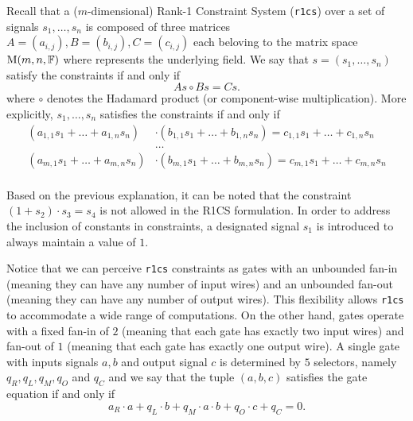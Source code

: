 Recall that a ($m$-dimensional) Rank-1 Constraint System (\texttt{r1cs}) over a set of signals $s_1, \dots, s_n$ is composed of three matrices $A = (a_{i, j}), B = (b_{i, j}),  C = (c_{i, j})$ each beloving to the matrix space $\mathrm{M}(m, n, \mathbb{F})$ where \FF represents the underlying field. We say that $s = (s_1, \dots, s_n)$ satisfy the constraints if and only if 
\[
As \circ Bs = Cs.
\]
where $\circ$ denotes the Hadamard product (or component-wise multiplication). More explicitly, $s_1, \dots, s_n$ satisfies the constraints if and only if
\begin{align*}
\left( a_{1, 1} s_1 + \dots + a_{1, n} s_n \right) &\cdot \left( b_{1, 1} s_1 + \dots + b_{1, n} s_n \right) = c_{1, 1} s_1 + \dots + c_{1, n} s_n \\
&\dots  \\
\left( a_{m, 1} s_1 + \dots + a_{m, n} s_n \right) &\cdot \left( b_{m, 1} s_1 + \dots + b_{m, n} s_n \right) = c_{m, 1} s_1 + \dots + c_{m, n} s_n \\
\end{align*}


Based on the previous explanation, it can be noted that the constraint $(1 + s_2) \cdot s_3 = s_4$ is not allowed in the R1CS formulation. In order to address the inclusion of constants in constraints, a designated signal $s_1$ is introduced to always maintain a value of $1$.

Notice that we can perceive \texttt{r1cs} constraints as gates with an unbounded fan-in (meaning they can have any number of input wires) and an unbounded fan-out (meaning they can have any number of output wires). This flexibility allows \texttt{r1cs} to accommodate a wide range of computations. On the other hand, \plonk gates operate with a fixed fan-in of $2$ (meaning that each gate has exactly two input wires) and fan-out of $1$ (meaning that each gate has exactly one output wire). A single \plonk gate with inputs signals $a, b$ and output signal $c$ is determined by $5$ selectors, namely $q_R, q_L, q_M, q_O$ and $q_C$ and we say that the tuple $(a, b, c)$ satisfies the gate equation if and only if
\[
a_R \cdot a + q_L \cdot b + q_M \cdot a \cdot b + q_O \cdot c + q_C = 0.
\]


